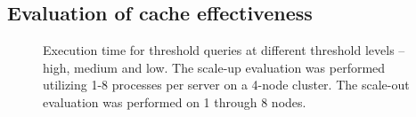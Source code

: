 \documentclass{sig-alternate}
\begin{document}
\subsection{Evaluation of cache effectiveness}

\begin{figure}
\centering
{}
\caption{Execution time for threshold queries at different threshold levels -- high, medium and low. The scale-up evaluation was performed 
utilizing 1-8 processes per server on a 4-node cluster. The scale-out evaluation was performed on 1 through 8 nodes.}
\label{fig:scaling}
\end{figure}
\end{document}
